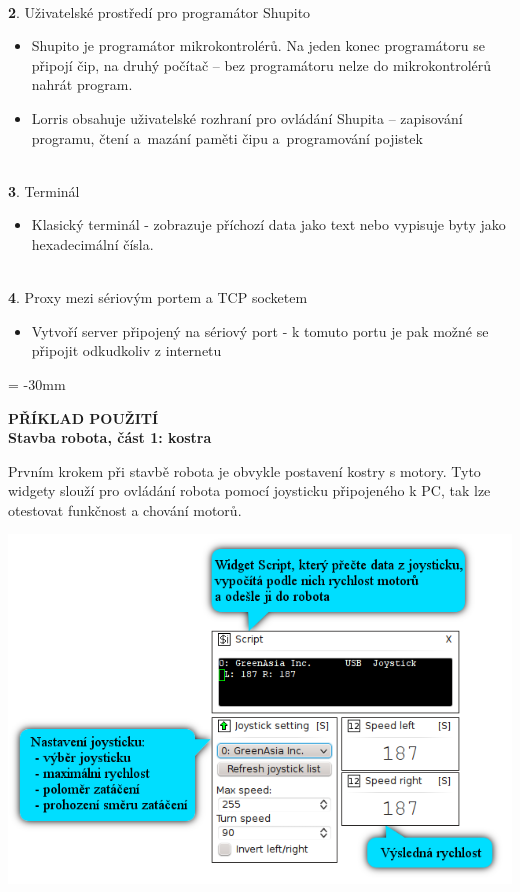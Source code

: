 \documentclass[12pt, a4paper, oneside]{article}
\newcommand{\B}{\textbf} %
\begin{document}
\\{\large \B 2. Uživatelské prostředí pro programátor Shupito }

\begin{itemize}
    \item Shupito je programátor mikrokontrolérů. Na jeden konec programátoru se připojí čip, na druhý počítač -- bez programátoru nelze do mikrokontrolérů nahrát program.
    \item Lorris obsahuje uživatelské rozhraní pro ovládání Shupita -- zapisování programu, čtení a~mazání paměti čipu a~programování pojistek
\end{itemize}

\\{\large \B 3. Terminál }

\begin{itemize}
    \item Klasický terminál - zobrazuje příchozí data jako text nebo vypisuje byty jako hexadecimální čísla.
\end{itemize}

\\{\large \B 4. Proxy mezi sériovým portem a TCP socketem }

\begin{itemize}
    \item Vytvoří server připojený na sériový port - k tomuto portu je pak možné se připojit odkudkoliv z internetu
\end{itemize}

\newpage
\voffset = -30mm %
\begin{center}
    \Large \B{PŘÍKLAD POUŽITÍ \\ Stavba robota, část 1: kostra}
\end{center}
\vspace{5mm}
Prvním krokem při stavbě robota je obvykle postavení kostry s motory. Tyto widgety slouží pro ovládání robota pomocí joysticku připojeného k PC, tak lze otestovat funkčnost a chování motorů.
\vspace{30mm}
\begin{center}
\includegraphics{img/joystick2.png}
\end{center}
\end{document}
